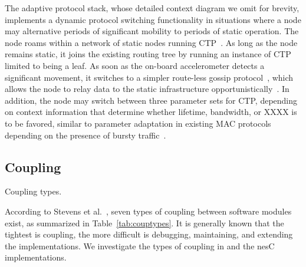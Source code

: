 The adaptive protocol stack, whose detailed context diagram we omit
for brevity, implements a dynamic protocol switching functionality in
situations where a node may alternative periods of significant
mobility to periods of static operation. The node roams within a
network of static nodes running CTP~\cite{CTP}. As long as the node
remains static, it joins the existing routing tree by running an
instance of CTP limited to being a leaf. As soon as the on-board
accelerometer detects a significant movement, it switches to a simpler
route-less gossip protocol~\cite{gossip}, which allows the node to
relay data to the static infrastructure
opportunistically~\cite{smarthop}. In addition, the node may switch
between three parameter sets for CTP, depending on context information
that determine whether lifetime, bandwidth, or XXXX is to be
favored, similar to parameter adaptation in existing MAC protocols
depending on the presence of bursty traffic~\cite{contikiMAC,XMAC}.



\subsection{Coupling}\label{sec:evalcomp}

\begin{table}[!tb]
\renewcommand{\arraystretch}{1.3}
\caption{Coupling types.}
\label{tab:couptypes}

\end{table}

According to Stevens et al.~\cite{stevens79}, seven types of coupling
between software modules exist, as summarized in
Table~\ref{tab:couptypes}. It is generally known that the tightest is
coupling, the more difficult is debugging, maintaining, and extending
the implementations. %
We investigate the types of coupling in \conesc and the nesC
implementations.

